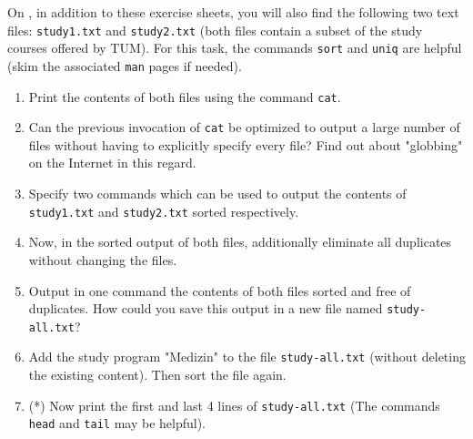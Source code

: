 \documentclass[english]{sheet}
\begin{document}
\begin{exercise}[subtitle=Pipes and Output Redirection]
    On , in addition to these exercise sheets, you will also find the following two text files: \texttt{study1.txt} and \texttt{study2.txt} (both files contain a subset of the study courses offered by TUM). For this task, the commands \texttt{sort} and \texttt{uniq} are helpful (skim the associated \texttt{man} pages if needed).
    \begin{enumerate}
        \item Print the contents of both files using the command \texttt{cat}.
        \item Can the previous invocation of \texttt{cat} be optimized to output a large number of files without having to explicitly specify every file? Find out about "globbing" on the Internet in this regard.
        \item Specify two commands which can be used to output the contents of  \texttt{study1.txt} and \texttt{study2.txt} sorted respectively.
        \item Now, in the sorted output of both files, additionally eliminate all duplicates without changing the files.
        \item Output in one command the contents of both files sorted and free of duplicates. How could you save this output in a new file named \texttt{study-all.txt}?
        \item Add the study program "Medizin" to the file \texttt{study-all.txt} (without deleting the existing content). Then sort the file again.
        \item (*) Now print the first and last 4 lines of \texttt{study-all.txt} (The commands \texttt{head} and \texttt{tail} may be helpful).
    \end{enumerate}
\end{exercise}
\end{document}
